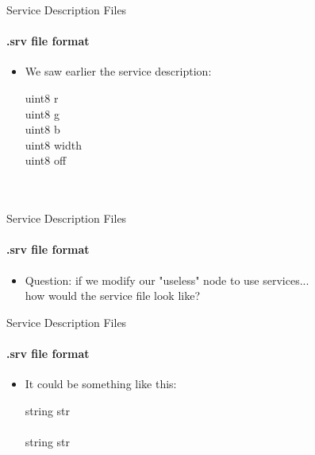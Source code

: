 \documentclass{beamer}
\begin{document}
\begin{frame}{Service Description Files}
    \framesubtitle{.srv file format}
    \begin{itemize}
        \item We saw earlier the {} service description:
        \begin{focus}
            \ttfamily
            uint8  \hspace{0.5cm} r\\
            uint8  \hspace{0.5cm} g\\
            uint8  \hspace{0.5cm} b\\
            uint8  \hspace{0.5cm} width\\
            uint8  \hspace{0.5cm} off\\
            \textemdash \textemdash \textemdash \\
            \\
        \end{focus} 
    \end{itemize}      
\end{frame}

\begin{frame}{Service Description Files}
    \framesubtitle{.srv file format}
    \begin{itemize}
        \item Question: if we modify our "useless" node to use services...\\ \vspace{10mm}     how would the service file look like?
    \end{itemize}             
\end{frame}


\begin{frame}{Service Description Files}
    \framesubtitle{.srv file format}
    \begin{itemize}
        \item It could be something like this: \vspace{5mm}
        \begin{focus}
            \ttfamily
            string  \hspace{0.5cm} str\\
            \textemdash \textemdash \textemdash \\
            string  \hspace{0.5cm} str\\
        \end{focus} 
    \end{itemize}      
\end{frame}
\end{document}
